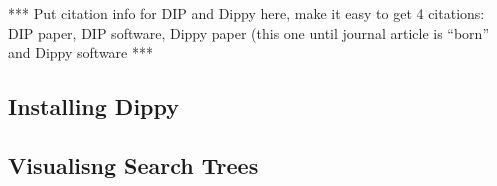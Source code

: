 
*** Put citation info for DIP and Dippy here, make it easy to get 4 citations: DIP paper, DIP software, Dippy paper (this one until journal article is ``born'' and Dippy software ***

\subsection{Installing Dippy} \label{sbs:install}

\subsection{Visualisng Search Trees} \label{sbs:gimpy}
